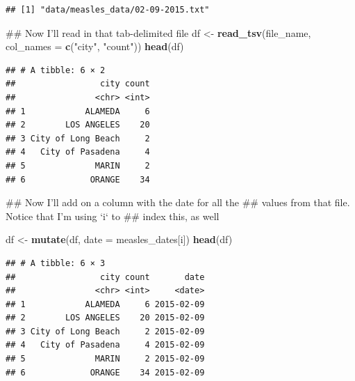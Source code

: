 \documentclass[]{book}
\makeatletter
\newenvironment{Shaded}{\begin{snugshade}}{\end{snugshade}}
\newcommand{\KeywordTok}[1]{\textcolor[rgb]{0.13,0.29,0.53}{\textbf{{#1}}}}
\newcommand{\DataTypeTok}[1]{\textcolor[rgb]{0.13,0.29,0.53}{{#1}}}
\newcommand{\StringTok}[1]{\textcolor[rgb]{0.31,0.60,0.02}{{#1}}}
\newcommand{\NormalTok}[1]{{#1}}
\newenvironment{kframe}{%
\medskip{}
\setlength{\fboxsep}{.8em}
 \def\at@end@of@kframe{}%
 \ifinner\ifhmode%
  \def\at@end@of@kframe{\end{minipage}}%
  \begin{minipage}{\columnwidth}%
 \fi\fi%
 \def\FrameCommand##1{\hskip\@totalleftmargin \hskip-\fboxsep
 \colorbox{shadecolor}{##1}\hskip-\fboxsep
     \hskip-\linewidth \hskip-\@totalleftmargin \hskip\columnwidth}%
 \MakeFramed {\advance\hsize-\width
   \@totalleftmargin\z@ \linewidth\hsize
   \@setminipage}}%
 {\par\unskip\endMakeFramed%
 \at@end@of@kframe}
\renewenvironment{Shaded}{\begin{kframe}}{\end{kframe}}
\makeatother
\begin{document}
\begin{verbatim}
## [1] "data/measles_data/02-09-2015.txt"
\end{verbatim}

\begin{Shaded}
\begin{Highlighting}[]
\NormalTok{## Now I'll read in that tab-delimited file}
\NormalTok{df <-}\StringTok{ }\KeywordTok{read_tsv}\NormalTok{(file_name, }\DataTypeTok{col_names =} \KeywordTok{c}\NormalTok{(}\StringTok{"city"}\NormalTok{, }\StringTok{"count"}\NormalTok{))}
\KeywordTok{head}\NormalTok{(df)}
\end{Highlighting}
\end{Shaded}

\begin{verbatim}
## # A tibble: 6 × 2
##                 city count
##                <chr> <int>
## 1            ALAMEDA     6
## 2        LOS ANGELES    20
## 3 City of Long Beach     2
## 4   City of Pasadena     4
## 5              MARIN     2
## 6             ORANGE    34
\end{verbatim}

\begin{Shaded}
\begin{Highlighting}[]
\NormalTok{## Now I'll add on a column with the date for all the }
\NormalTok{## values from that file. Notice that I'm using `i` to }
\NormalTok{## index this, as well}

\NormalTok{df <-}\StringTok{ }\KeywordTok{mutate}\NormalTok{(df, }\DataTypeTok{date =} \NormalTok{measles_dates[i])}
\KeywordTok{head}\NormalTok{(df)}
\end{Highlighting}
\end{Shaded}

\begin{verbatim}
## # A tibble: 6 × 3
##                 city count       date
##                <chr> <int>     <date>
## 1            ALAMEDA     6 2015-02-09
## 2        LOS ANGELES    20 2015-02-09
## 3 City of Long Beach     2 2015-02-09
## 4   City of Pasadena     4 2015-02-09
## 5              MARIN     2 2015-02-09
## 6             ORANGE    34 2015-02-09
\end{verbatim}
\end{document}
